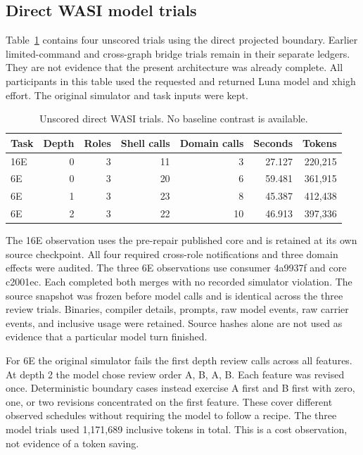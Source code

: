 \documentclass[10pt]{article}
\begin{document}
\subsection{Direct WASI model trials}
Table~\ref{tab:preflight} contains four unscored trials using the direct projected
boundary. Earlier limited-command and cross-graph bridge trials remain in their
separate ledgers. They are not evidence that the present architecture was
already complete. All participants in this table used the requested and returned
Luna model and xhigh effort. The original simulator and task inputs were kept.
\begin{table}[h]
\centering
\caption{Unscored direct WASI trials. No baseline contrast is available.}
\label{tab:preflight}
\begin{tabular}{lrrrrrr}
\toprule
Task & Depth & Roles & Shell calls & Domain calls & Seconds & Tokens \\
\midrule
16E & 0 & 3 & 11 & 3 & 27.127 & 220,215 \\
6E & 0 & 3 & 20 & 6 & 59.481 & 361,915 \\
6E & 1 & 3 & 23 & 8 & 45.387 & 412,438 \\
6E & 2 & 3 & 22 & 10 & 46.913 & 397,336 \\
\bottomrule
\end{tabular}
\end{table}

The 16E observation uses the pre-repair published core and is retained at its
own source checkpoint. All four required cross-role notifications and three
domain effects were audited. The three 6E observations use consumer 4a9937f and
core c2001ec. Each completed both merges with no recorded simulator violation.
The source snapshot was frozen before model calls and is identical across the
three review trials. Binaries, compiler details, prompts, raw model events, raw
carrier events, and inclusive usage were retained. Source hashes alone are not
used as evidence that a particular model turn finished.

For 6E the original simulator fails the first depth review calls across all
features. At depth 2 the model chose review order A, B, A, B. Each feature was
revised once. Deterministic boundary cases instead exercise A first and B first
with zero, one, or two revisions concentrated on the first feature. These cover
different observed schedules without requiring the model to follow a recipe.
The three model trials used 1,171,689 inclusive tokens in total. This is a cost
observation, not evidence of a token saving.
\end{document}
